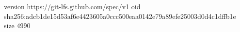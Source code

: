 version https://git-lfs.github.com/spec/v1
oid sha256:adcb1de15d53af6e4423605a0ccc500eaa0142e79a89efe25003d0d4c1dffb1e
size 4990

